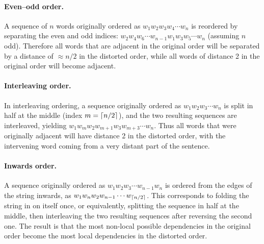 \documentclass[10pt,twoside,lineno]{article}
\newcommand{\key}[1]{\textbf{#1}}
\DeclarePairedDelimiter{\ceiling}{\lceil}{\rceil}
\begin{document}



\paragraph{Even--odd order.} A sequence of $n$ words originally ordered as $w_1 w_2 w_3 w_4 \cdots w_n$ is reordered by separating the even and odd indices: $w_2 w_4 w_6 \cdots w_{n-1} w_1 w_3 w_5 \cdots w_n$ (assuming $n$ odd). Therefore all words that are adjacent in the original order will be separated by a distance of $\approx n/2$ in the distorted order, while all words of distance 2 in the original order will become adjacent.

\paragraph{Interleaving order.} In interleaving ordering, a sequence originally ordered as $w_1 w_2 w_3 \cdots w_n$ is split in half at the middle (index $m=\ceiling{n/2}$), and the two resulting sequences are interleaved, yielding $w_1 w_m w_2 w_{m+1} w_3 w_{m+3} \cdots w_n$. Thus all words that were originally adjacent will have distance 2 in the distorted order, with the intervening word coming from a very distant part of the sentence.

\paragraph{Inwards order.} A sequence originally ordered as $w_1 w_2 w_3 \cdots w_{n-1} w_n$ is ordered from the edges of the string inwards, as $w_1 w_n w_2 w_{n-1} \cdots w_{\ceiling{n/2}}$. This corresponds to folding the string in on itself once, or equivalently, splitting the sequence in half at the middle, then interleaving the two resulting sequences after reversing the second one. The result is that the most non-local possible dependencies in the original order become the most local dependencies in the distorted order.
\end{document}

